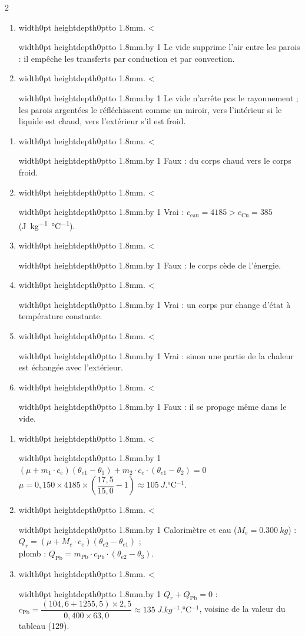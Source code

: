 \documentclass[11pt,a4paper]{article}
\newif\ifeleve
\newlength{\interligne}\setlength{\interligne}{7mm}
\newlength{\replen}
\newcommand{\pointilles}{{\color{cInk2!60}\leaders\hbox to 1.8mm{\hss.\hss}\hfill}\kern0pt}
\newcommand{\lignes}[1]{\leavevmode\vrule width0pt height\dimexpr\interligne-1mm\relax depth0pt\pointilles
  \lgn=1 \loop\ifnum\lgn<#1 \par\nointerlineskip\noindent\vrule width0pt height\interligne depth0pt\pointilles\advance\lgn by 1 \repeat}
\newcommand{\rep}[1]{%
  \ifeleve
    \sbox{\repbox}{\parbox{\linewidth}{#1}}%
    \replen=\dimexpr\ht\repbox+\dp\repbox\relax
    \repn=\numexpr\replen/\baselineskip+1\relax
    \ifnum\repn<2 \repn=2\fi
    \edef\nblignes{\the\repn}\lignes{\nblignes}%
  \else #1\fi}
\newcommand{\cu}{\unit{J.kg^{-1}.\degreeCelsius^{-1}}}
\begin{document}
\begin{multicols}{2}
\begin{enumerate}[label={\sffamily\bfseries\arabic*.},leftmargin=5mm,itemsep=1pt]
  \item \rep{Le vide supprime l’air entre les parois : il empêche les transferts par conduction et par convection.}
  \item \rep{Le vide n’arrête pas le rayonnement ; les parois argentées le réfléchissent comme un miroir, vers l’intérieur si le liquide est chaud, vers l’extérieur s’il est froid.}
\end{enumerate}

\begin{enumerate}[label={\sffamily\bfseries\alph*)},leftmargin=5mm,itemsep=0pt]
  \item \rep{Faux : du corps chaud vers le corps froid.}
  \item \rep{Vrai : $c_{\mathrm{eau}} = 4185 > c_{\mathrm{Cu}} = 385$ (\cu).}
  \item \rep{Faux : le corps cède de l’énergie.}
  \item \rep{Vrai : un corps pur change d’état à température constante.}
  \item \rep{Vrai : sinon une partie de la chaleur est échangée avec l’extérieur.}
  \item \rep{Faux : il se propage même dans le vide.}
\end{enumerate}

\begin{enumerate}[label={\sffamily\bfseries\arabic*.},leftmargin=5mm,itemsep=1pt]
  \item \rep{$(\mu + m_1\cdot c_e)(\theta_{e1} - \theta_1) + m_2\cdot c_e\cdot(\theta_{e1} - \theta_2) = 0$\\ $\mu = 0{,}150\times4185\times\left(\dfrac{17{,}5}{15{,}0} - 1\right) \approx \qty{105}{J.\degreeCelsius^{-1}}$.}
  \item \rep{Calorimètre et eau ($M_e = \qty{0,300}{kg}$) : $Q_r = (\mu + M_e\cdot c_e)(\theta_{e2} - \theta_{e1})$ ;\\ plomb : $Q_{\mathrm{Pb}} = m_{\mathrm{Pb}}\cdot c_{\mathrm{Pb}}\cdot(\theta_{e2} - \theta_3)$.}
  \item \rep{$Q_r + Q_{\mathrm{Pb}} = 0$ : $c_{\mathrm{Pb}} = \dfrac{(104{,}6 + 1255{,}5)\times2{,}5}{0{,}400\times63{,}0} \approx \qty{135}{J.kg^{-1}.\degreeCelsius^{-1}}$, voisine de la valeur du tableau (129).}
\end{enumerate}


\end{multicols}
\end{document}
